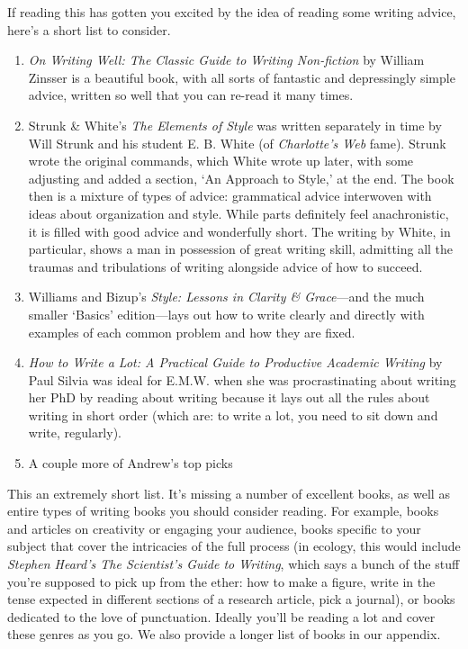 \documentclass[11pt,letter]{article}
\begin{document}
If reading this has gotten you excited by the idea of reading some writing advice, here's a short list to consider. 
\begin{enumerate}
\item \emph{On Writing Well: The Classic Guide to Writing Non-fiction} by William Zinsser is a beautiful book, with all sorts of fantastic and depressingly simple advice, written so well that you can re-read it many times. 
\item Strunk \& White’s \emph{The Elements of Style} was written separately in time by Will Strunk and his student E. B. White (of \emph{Charlotte’s Web} fame). Strunk wrote the original commands, which White wrote up later, with some adjusting and added a section, `An Approach to Style,’ at the end. The book then is a mixture of types of advice: grammatical advice interwoven with ideas about organization and style. While parts definitely feel anachronistic, it is filled with good advice and wonderfully short. The writing by White, in particular, shows a man in possession of great writing skill, admitting all the traumas and tribulations of writing alongside advice of how to succeed. 
\item Williams and Bizup's \emph{Style: Lessons in Clarity \& Grace}---and the much smaller `Basics' edition---lays out how to write clearly and directly with examples of each common problem and how they are fixed. 
\item \emph{How to Write a Lot: A Practical Guide to Productive Academic Writing} by Paul Silvia was ideal for E.M.W. when she was procrastinating about writing her PhD by reading about writing because it lays out all the rules about writing in short order (which are: to write a lot, you need to sit down and write, regularly). 
\item A couple more of Andrew's top picks
\end{enumerate}

This an extremely short list. It's missing a number of excellent books, as well as entire types of writing books you should consider reading. For example, books and articles on creativity or engaging your audience, books specific to your subject that cover the intricacies of the full process (in ecology, this would include \emph{Stephen Heard’s The Scientist’s Guide to Writing}, which says a bunch of the stuff you’re supposed to pick up from the ether: how to make a figure, write in the tense expected in different sections of a research article, pick a journal), or books dedicated to the love of punctuation. Ideally you'll be reading a lot and cover these genres as you go. We also provide a longer list of books in our appendix. 
\end{document}
